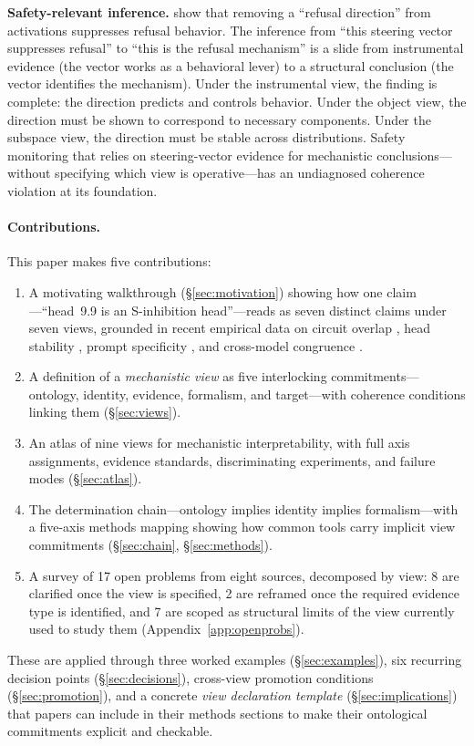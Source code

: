 \documentclass{article}
\begin{document}
\textbf{Safety-relevant inference.}
\citet{arditi2024} show that removing a ``refusal direction'' from
activations suppresses refusal behavior.  The inference from ``this
steering vector suppresses refusal'' to ``this is the refusal
mechanism'' is a slide from instrumental evidence (the vector works as
a behavioral lever) to a structural conclusion (the vector identifies
the mechanism).  Under the instrumental view, the finding is complete:
the direction predicts and controls behavior.  Under the object view,
the direction must be shown to correspond to necessary components.
Under the subspace view, the direction must be stable across
distributions.  Safety monitoring that relies on steering-vector
evidence for mechanistic conclusions---without specifying which view
is operative---has an undiagnosed coherence violation at its
foundation.

\paragraph{Contributions.}
This paper makes five contributions:
\begin{enumerate}[leftmargin=*]
\item A motivating walkthrough (\S\ref{sec:motivation}) showing how one
      claim---``head~9.9 is an S-inhibition head''---reads as seven
      distinct claims under seven views, grounded in recent empirical
      data on circuit overlap \citep{merullo2024}, head stability
      \citep{bali2026}, prompt specificity \citep{franco2026}, and
      cross-model congruence \citep{sun2026}.
\item A definition of a \emph{mechanistic view} as five interlocking
      commitments---ontology, identity, evidence, formalism, and
      target---with coherence conditions linking them
      (\S\ref{sec:views}).
\item An atlas of nine views for mechanistic interpretability,
      with full axis assignments, evidence standards, discriminating
      experiments, and failure modes (\S\ref{sec:atlas}).
\item The determination chain---ontology implies identity implies
      formalism---with a five-axis methods mapping showing how common
      tools carry implicit view commitments
      (\S\ref{sec:chain}, \S\ref{sec:methods}).
\item A survey of 17 open problems from eight sources, decomposed by
      view: 8 are clarified once the view is specified, 2 are reframed
      once the required evidence type is identified, and 7 are scoped
      as structural limits of the view currently used to study them
      (Appendix~\ref{app:openprobs}).
\end{enumerate}
These are applied through three worked examples (\S\ref{sec:examples}),
six recurring decision points (\S\ref{sec:decisions}),
cross-view promotion conditions (\S\ref{sec:promotion}), and a
concrete \emph{view declaration template} (\S\ref{sec:implications})
that papers can include in their methods sections to make their
ontological commitments explicit and checkable.
\end{document}
